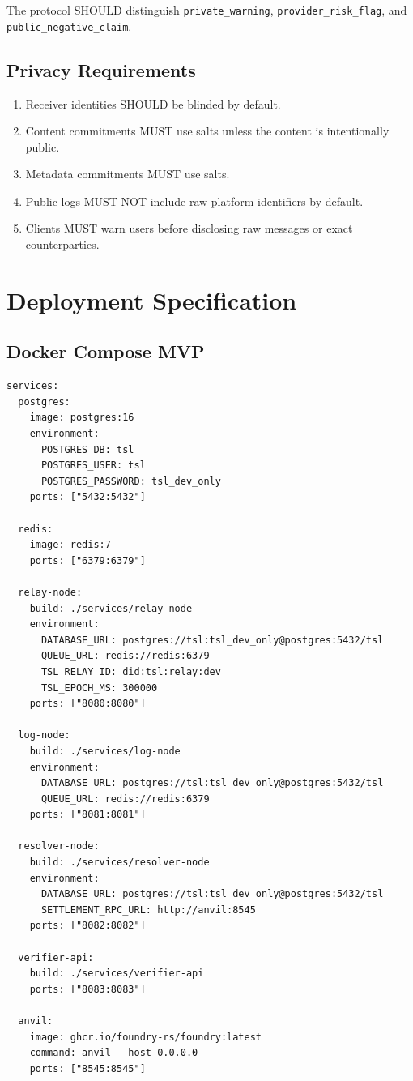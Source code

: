 \documentclass[11pt]{article}
\begin{document}
The protocol SHOULD distinguish \texttt{private\_warning}, \texttt{provider\_risk\_flag}, and \texttt{public\_negative\_claim}.

\subsection{Privacy Requirements}

\begin{enumerate}
    \item Receiver identities SHOULD be blinded by default.
    \item Content commitments MUST use salts unless the content is intentionally public.
    \item Metadata commitments MUST use salts.
    \item Public logs MUST NOT include raw platform identifiers by default.
    \item Clients MUST warn users before disclosing raw messages or exact counterparties.
\end{enumerate}

\section{Deployment Specification}

\subsection{Docker Compose MVP}

\begin{lstlisting}[style=tslcode]
services:
  postgres:
    image: postgres:16
    environment:
      POSTGRES_DB: tsl
      POSTGRES_USER: tsl
      POSTGRES_PASSWORD: tsl_dev_only
    ports: ["5432:5432"]

  redis:
    image: redis:7
    ports: ["6379:6379"]

  relay-node:
    build: ./services/relay-node
    environment:
      DATABASE_URL: postgres://tsl:tsl_dev_only@postgres:5432/tsl
      QUEUE_URL: redis://redis:6379
      TSL_RELAY_ID: did:tsl:relay:dev
      TSL_EPOCH_MS: 300000
    ports: ["8080:8080"]

  log-node:
    build: ./services/log-node
    environment:
      DATABASE_URL: postgres://tsl:tsl_dev_only@postgres:5432/tsl
      QUEUE_URL: redis://redis:6379
    ports: ["8081:8081"]

  resolver-node:
    build: ./services/resolver-node
    environment:
      DATABASE_URL: postgres://tsl:tsl_dev_only@postgres:5432/tsl
      SETTLEMENT_RPC_URL: http://anvil:8545
    ports: ["8082:8082"]

  verifier-api:
    build: ./services/verifier-api
    ports: ["8083:8083"]

  anvil:
    image: ghcr.io/foundry-rs/foundry:latest
    command: anvil --host 0.0.0.0
    ports: ["8545:8545"]
\end{lstlisting}
\end{document}

